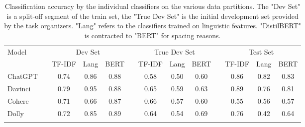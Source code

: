 \begin{table}[ht]
    \centering
    \vspace{0.1cm}
    \begin{tabular}{lp{5px}cccp{5px}cccp{5px}ccc}
        \hline
        \multirow{2}{*}{Model} &  & \multicolumn{3}{c}{Dev Set} &             & \multicolumn{3}{c}{True Dev Set} &  & \multicolumn{3}{c}{Test Set}                                                                            \\
                               &  & \tiny{TF-IDF}               & \tiny{Lang} & \tiny{BERT}                      &  & \tiny{TF-IDF}                & \tiny{Lang} & \tiny{BERT} &  & \tiny{TF-IDF} & \tiny{Lang} & \tiny{BERT} \\
        \hline
        ChatGPT                &  & 0.74                        & 0.86        & 0.88                             &  & 0.58                         & 0.50        & 0.60        &  & 0.86          & 0.82        & 0.83        \\
        Davinci                &  & 0.79                        & 0.95        & 0.88                             &  & 0.65                         & 0.59        & 0.63        &  & 0.89          & 0.76        & 0.81        \\
        Cohere                 &  & 0.71                        & 0.66        & 0.87                             &  & 0.66                         & 0.57        & 0.60        &  & 0.55          & 0.56        & 0.57        \\
        Dolly                  &  & 0.72                        & 0.85        & 0.89                             &  & 0.64                         & 0.54        & 0.69        &  & 0.76          & 0.42        & 0.64        \\
        \hline
        \vspace{0.1cm}
    \end{tabular}
    \caption{
        Classification accuracy by the individual classifiers on the various data partitions.
        The "Dev Set" is a split-off segment of the train set, the "True Dev Set" is the initial development set provided by the task organizers.
        "Lang" refers to the classifiers trained on linguistic features.
        "DistilBERT" is contracted to "BERT" for spacing reasons.
    }
    \label{tab:subsolutions-initial}
\end{table}

